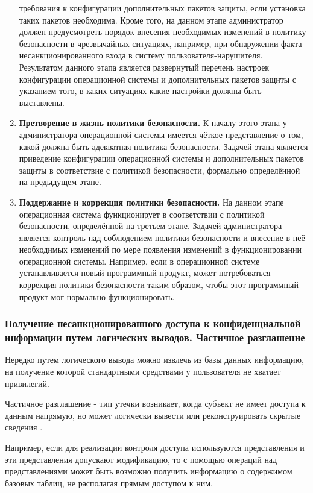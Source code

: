 \begin{enumerate}
        требования к конфигурации дополнительных пакетов защиты, если установка таких пакетов
        необходима. Кроме того, на данном этапе администратор должен предусмотреть порядок внесения
        необходимых изменений в политику безопасности в чрезвычайных ситуациях, например, при
        обнаружении факта несанкционированного входа в систему пользователя-нарушителя. Результатом
        данного этапа является развернутый перечень настроек конфигурации операционной системы и
        дополнительных пакетов защиты с указанием того, в каких ситуациях какие настройки должны быть
        выставлены.
    \item \textbf{Претворение в жизнь политики безопасности.} К началу этого этапа у администратора
        операционной системы имеется чёткое представление о том, какой должна быть адекватная политика
        безопасности. Задачей этапа является приведение конфигурации операционной системы и
        дополнительных пакетов защиты в соответствие с политикой безопасности, формально определённой
        на предыдущем этапе.
    \item \textbf{Поддержание и коррекция политики безопасности.} На данном этапе операционная
    система функционирует в соответствии с политикой безопасности, определённой на третьем этапе.
    Задачей администратора является контроль над соблюдением политики безопасности и внесение в неё
    необходимых изменений по мере появления изменений в функционировании операционной системы.
    Например, если в операционной системе устанавливается новый программный продукт, может
    потребоваться коррекция политики безопасности таким образом, чтобы этот программный продукт мог
    нормально функционировать.
\end{enumerate}


\subsubsection{Получение несанкционированного доступа к конфиденциальной информации путем логических выводов. Частичное разглашение}
Нередко путем логического вывода можно извлечь из базы данных информацию, на получение которой
стандартными средствами у пользователя не хватает привилегий.

Частичное разглашение - тип утечки возникает, когда субъект не имеет доступа к данным напрямую, но может логически вывести или реконструировать скрытые сведения \cite{bdufstec}.

Например, если для реализации контроля доступа используются представления и эти представления допускают
модификацию, то с помощью операций над представлениями может быть возможно получить информацию о
содержимом базовых таблиц, не располагая прямым доступом к ним.

